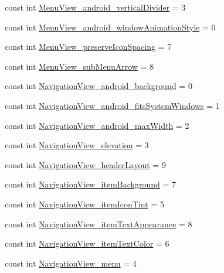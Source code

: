 \begin{CompactItemize}
\item 
const int \hyperlink{class__2doo_1_1_droid_1_1_resource_1_1_styleable_10990185e2663c58a096760c38ca68ad}{MenuView\_\-android\_\-verticalDivider} = 3
\item 
const int \hyperlink{class__2doo_1_1_droid_1_1_resource_1_1_styleable_ad68099861e3503d5641dcced97074c5}{MenuView\_\-android\_\-windowAnimationStyle} = 0
\item 
const int \hyperlink{class__2doo_1_1_droid_1_1_resource_1_1_styleable_001ae68563d4681d9e1bdc7337792db8}{MenuView\_\-preserveIconSpacing} = 7
\item 
const int \hyperlink{class__2doo_1_1_droid_1_1_resource_1_1_styleable_b5d7130fde4a237ecd92b8084434f3ab}{MenuView\_\-subMenuArrow} = 8
\item 
const int \hyperlink{class__2doo_1_1_droid_1_1_resource_1_1_styleable_45b609a33b0ec6f439944b833deecd9d}{NavigationView\_\-android\_\-background} = 0
\item 
const int \hyperlink{class__2doo_1_1_droid_1_1_resource_1_1_styleable_061142e3a6e89d7471de1755f97a152a}{NavigationView\_\-android\_\-fitsSystemWindows} = 1
\item 
const int \hyperlink{class__2doo_1_1_droid_1_1_resource_1_1_styleable_d9f63dcbc4c65fe8bbe54bfd2ee94f83}{NavigationView\_\-android\_\-maxWidth} = 2
\item 
const int \hyperlink{class__2doo_1_1_droid_1_1_resource_1_1_styleable_4895b7ed86afd45e8554dcd90ff40a53}{NavigationView\_\-elevation} = 3
\item 
const int \hyperlink{class__2doo_1_1_droid_1_1_resource_1_1_styleable_c08a97f9a8978506f319abbd17546613}{NavigationView\_\-headerLayout} = 9
\item 
const int \hyperlink{class__2doo_1_1_droid_1_1_resource_1_1_styleable_2a14ff5b2539ba0e2003d2da920e2691}{NavigationView\_\-itemBackground} = 7
\item 
const int \hyperlink{class__2doo_1_1_droid_1_1_resource_1_1_styleable_24453af4bb8c58763d573f437e4a2d63}{NavigationView\_\-itemIconTint} = 5
\item 
const int \hyperlink{class__2doo_1_1_droid_1_1_resource_1_1_styleable_21beba46b7f3b0d67bfa6b999ba674c0}{NavigationView\_\-itemTextAppearance} = 8
\item 
const int \hyperlink{class__2doo_1_1_droid_1_1_resource_1_1_styleable_cad12f3dbb042cdee8749e11d3b37746}{NavigationView\_\-itemTextColor} = 6
\item 
const int \hyperlink{class__2doo_1_1_droid_1_1_resource_1_1_styleable_9bd4ad0abe15fb48c8b0256bc2c2fef8}{NavigationView\_\-menu} = 4

\end{CompactItemize}
